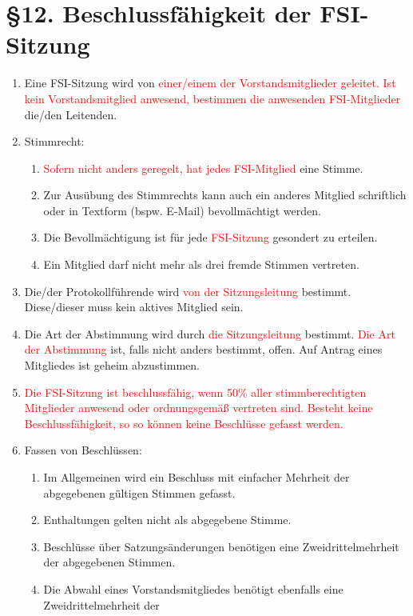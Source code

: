 \documentclass[a4paper,12pt]{article}
\newcommand{\red}[1]{\textcolor{red}{#1}}
\begin{document}
\section*{§12. Beschlussfähigkeit der FSI-Sitzung}
\begin{enumerate}
	\item
	Eine FSI-Sitzung wird von \red{einer/einem der Vorstandsmitglieder geleitet. Ist kein Vorstandsmitglied anwesend,
	bestimmen die anwesenden FSI-Mitglieder} die/den Leitenden.
	\item
	\label{10.1_Stimmrecht}
	Stimmrecht:
	\begin{enumerate}[label=(\roman*)]
		\item
		\red{Sofern nicht anders geregelt, hat jedes FSI-Mitglied} eine Stimme.
		\item
		Zur Ausübung des Stimmrechts kann auch ein
		anderes Mitglied schriftlich oder in Textform
		(bspw. E-Mail) bevollmächtigt werden.
		\item
		Die Bevollmächtigung ist für jede
		\red{FSI-Sitzung} gesondert zu erteilen.
		\item
		Ein Mitglied darf nicht mehr als drei
		fremde Stimmen vertreten.
	\end{enumerate}
	\item
	Die/der Protokollführende wird \red{von der Sitzungsleitung} bestimmt.
	Diese/dieser muss kein aktives Mitglied sein.
	\item
	Die Art der Abstimmung wird durch \red{die Sitzungsleitung} bestimmt. \red{Die Art der Abstimmung}
	ist, falls nicht anders bestimmt, offen. Auf Antrag eines
	Mitgliedes ist geheim abzustimmen.
	\item
	\red{Die FSI-Sitzung ist beschlussfähig, wenn 50\%
	aller stimmberechtigten \red{Mitglieder} anwesend oder
	ordnungsgemäß vertreten sind. Besteht keine Beschlussfähigkeit,
	so so können keine Beschlüsse gefasst werden.}
	\item
	Fassen von Beschlüssen:
	\begin{enumerate}[label=(\roman*)]
		\item
		Im Allgemeinen wird ein Beschluss mit einfacher
		Mehrheit der abgegebenen gültigen Stimmen
		gefasst.
		\item
		Enthaltungen gelten nicht als abgegebene Stimme.
		\item
		Beschlüsse über Satzungsänderungen benötigen
		eine Zweidrittelmehrheit der abgegebenen
		Stimmen.
		\item
		Die Abwahl eines Vorstandsmitgliedes benötigt
		ebenfalls eine Zweidrittelmehrheit der

\end{enumerate}
\end{enumerate}
\end{document}
